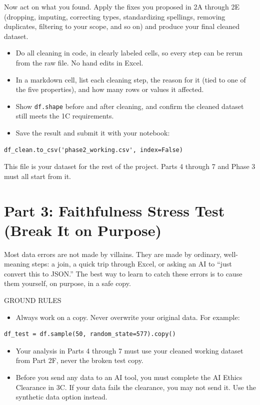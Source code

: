 \documentclass[11pt,letterpaper]{article}
\newcommand{\code}[1]{\texttt{#1}}
\begin{document}
Now act on what you found. Apply the fixes you proposed in 2A through 2E (dropping, imputing, correcting types, standardizing spellings, removing duplicates, filtering to your scope, and so on) and produce your final cleaned dataset.
\begin{itemize}
  \item Do all cleaning in code, in clearly labeled cells, so every step can be rerun from the raw file. No hand edits in Excel.
  \item In a markdown cell, list each cleaning step, the reason for it (tied to one of the five properties), and how many rows or values it affected.
  \item Show \code{df.shape} before and after cleaning, and confirm the cleaned dataset still meets the 1C requirements.
  \item Save the result and submit it with your notebook:
\end{itemize}
\begin{lstlisting}
df_clean.to_csv('phase2_working.csv', index=False)
\end{lstlisting}

This file is your dataset for the rest of the project. Parts 4 through 7 and Phase 3 must all start from it.

\section{Part 3: Faithfulness Stress Test (Break It on Purpose)}

Most data errors are not made by villains. They are made by ordinary, well-meaning steps: a join, a quick trip through Excel, or asking an AI to ``just convert this to JSON.'' The best way to learn to catch these errors is to cause them yourself, on purpose, in a safe copy.

\begin{warnbox}{GROUND RULES}
\begin{itemize}
  \item Always work on a copy. Never overwrite your original data. For example:
\end{itemize}
\begin{lstlisting}
df_test = df.sample(50, random_state=577).copy()
\end{lstlisting}
\begin{itemize}
  \item Your analysis in Parts 4 through 7 must use your cleaned working dataset from Part 2F, never the broken test copy.
  \item Before you send any data to an AI tool, you must complete the AI Ethics Clearance in 3C. If your data fails the clearance, you may not send it. Use the synthetic data option instead.
\end{itemize}
\end{warnbox}
\end{document}
